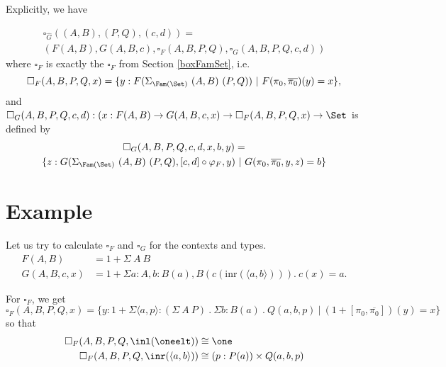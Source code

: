 \documentclass{article}
\begin{document}
Explicitly, we have 

\begin{multline*}
    \square_{\widehat{G}}((A, B), (P, Q), (c, d)) = \\
  (F(A, B), G(A, B, c), \square_F(A, B, P, Q), \square_G(A, B, P, Q, c, d))
\end{multline*}
where $\square_F$ is exactly the $\square_F$ from Section
\ref{boxFamSet}, i.e.
\[
\square_F(A, B, P, Q, x) =
\{ y : F(\Sigma_{\Fam(\Set)}\ (A, B)\ (P, Q))\ |\ F(\pi_0, \overline{\pi_0})(y) = x\},
\]
and $\square_G(A, B, P, Q, c, d) : (x : F(A, B) \to G(A, B, c, x) \to \square_F(A, B, P,
Q, x) \to \Set$ is defined by
\begin{multline*}
\square_G(A, B, P, Q, c, d, x, b, y) = \\
  \{ z : G(\Sigma_{\Fam(\Set)}\ (A, B)\ (P, Q), [c, d] \circ \varphi_F, y)\ |\ G(\pi_0, \overline{\pi_0}, y, z) = b \}
\end{multline*}


\section{Example}

Let us try to calculate $\square_F$ and $\square_G$ for the contexts and types.
\begin{align*}
  F(A, B) &= 1 + \Sigma\ A\ B \\
  G(A, B, c, x) &= 1 + \Sigma a : A, b : B(a), B(c (\text{inr}(\langle a, b\rangle))).\ c(x) = a.
\end{align*}

For $\square_F$, we get
\[
\square_F(A, B, P, Q, x) = \{ y : 1 + \Sigma \langle a, p\rangle\!:\!(\Sigma\ A\ P)\ .\ \Sigma\!b\!: B(a)\ .\ Q(a, b, p)\ |\ (1 + [\pi_0, \overline{\pi_0}])(y) = x \}
\]
so that
\begin{align*}
  \square_F(A, B, P, Q, \inl(\oneelt)) &\cong \one \\
  \square_F(A, B, P, Q, \inr(\langle a, b\rangle)) &\cong (p : P(a)) \times Q(a, b, p)
\end{align*}
\end{document}
